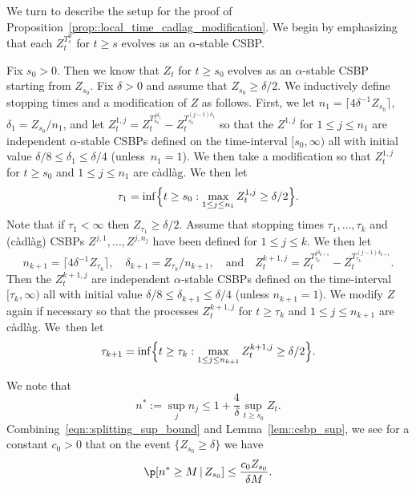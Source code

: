 \documentclass[10pt]{amsart}
\theoremstyle{plain}
\numberwithin{theorem}{section}
\theoremstyle{definition}
\newcommand{\cadlag}{càdlàg}
\newcommand{\giv}{\,|\,}
\begin{document}
We turn to describe the setup for the proof of Proposition~\ref{prop::local_time_cadlag_modification}. We begin by emphasizing that each $Z_t^{T_s^u}$ for $t \geq s$ evolves as an $\alpha$-stable CSBP.

Fix $s_0 > 0$. Then we know that $Z_t$ for $t \geq s_0$ evolves as an $\alpha$-stable CSBP starting from $Z_{s_0}$. Fix $\delta > 0$ and assume that $Z_{s_0} \geq \delta/2$. We inductively define stopping times and a modification of $Z$ as follows. First, we let $n_1 = \lceil 4\delta^{-1} Z_{s_0} \rceil$, $\delta_1 = Z_{s_0} / n_1$, and let $Z_t^{1,j} = Z_t^{T_{s_0}^{j\delta_1}} - Z_t^{T_{s_0}^{(j-1)\delta_1}}$ so that the $Z^{1,j}$ for $1 \leq j \leq n_1$ are independent $\alpha$-stable CSBPs defined on the time-interval $[s_0,\infty)$ all with initial value $\delta/8 \leq \delta_1 \leq \delta/4$ \hbox{(unless $n_1 = 1$)}. We then take a modification so that $Z_t^{1,j}$ for $t \geq s_0$ and $1 \leq j \leq n_1$ are {\cadlag}. We then let
\[
\tau_1 = \inf\Bigl\{t \geq s_0 : \max_{1 \leq j \leq n_1} Z_t^{1,j} \geq \delta/2 \Bigr\}.
\]
Note that if $\tau_1 < \infty$ then $Z_{\tau_1} \geq \delta/2$.
Assume that stopping times $\tau_1,\ldots,\tau_k$ and (\cadlag) CSBPs $Z^{j,1},\ldots,Z^{j,n_j}$ have been defined for $1 \leq j \leq k$. We then let
\[
n_{k+1} = \lceil 4 \delta^{-1} Z_{\tau_k} \rceil,\quad \delta_{k+1} = Z_{\tau_k} / n_{k+1},\quad \text{and}\quad Z_t^{k+1,j} = Z_t^{T_{\tau_k}^{j \delta_{k+1}}} - Z_t^{T_{\tau_k}^{(j-1)\delta_{k+1}}}.
\]
Then the $Z_t^{k+1,j}$ are independent $\alpha$-stable CSBPs defined on the time-interval $[\tau_k,\infty)$ all with initial value $\delta/8 \leq \delta_{k+1} \leq \delta/4$ (unless $n_{k+1} = 1$). We modify $Z$ again if necessary so that the processes $Z_t^{k+1,j}$ for $t \geq \tau_k$ and $1 \leq j \leq n_{k+1}$ are {\cadlag}. We~then let
\[
\tau_{k+1} = \inf\Bigl\{t \geq \tau_k : \max_{1 \leq j \leq n_{k+1}} Z_t^{k+1,j} \geq \delta/2 \Bigr\}.
\]

We note that
\begin{equation}
\label{eqn::splitting_sup_bound}
n^* := \sup_j n_j \leq 1+ \frac{4}{\delta} \sup_{t \geq s_0} Z_t.
\end{equation}
Combining~\eqref{eqn::splitting_sup_bound} and Lemma~\ref{lem::csbp_sup}, we see for a constant $c_0 > 0$ that on the event $\{Z_{s_0} \geq \delta\}$ we have
\begin{equation}
\label{eqn::splitting_bound}
\p[n^* \geq M \giv Z_{s_0}] \leq \frac{c_0 Z_{s_0}}{\delta M}.
\end{equation}
\end{document}
